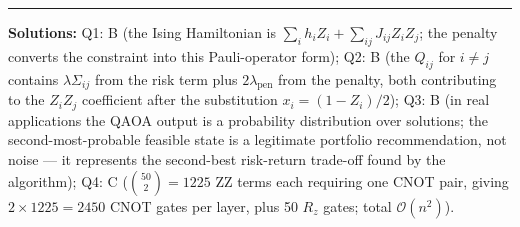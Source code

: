 \documentclass[a4paper,11pt]{article}
\begin{document}
\vspace{1cm}
\hrule
\vspace{0.2cm}
\footnotesize{\textbf{Solutions:}
Q1: B (the Ising Hamiltonian is $\sum_i h_i Z_i + \sum_{ij} J_{ij} Z_iZ_j$;
    the penalty converts the constraint into this Pauli-operator form);
Q2: B (the $Q_{ij}$ for $i\neq j$ contains $\lambda\Sigma_{ij}$ from
    the risk term plus $2\lambda_\text{pen}$ from the penalty, both
    contributing to the $Z_iZ_j$ coefficient after the substitution
    $x_i=(1-Z_i)/2$);
Q3: B (in real applications the QAOA output is a probability distribution
    over solutions; the second-most-probable feasible state is a legitimate
    portfolio recommendation, not noise — it represents the second-best
    risk-return trade-off found by the algorithm);
Q4: C ($\binom{50}{2} = 1225$ ZZ terms each requiring one CNOT pair,
    giving $2\times 1225 = 2450$ CNOT gates per layer, plus 50 $R_z$
    gates; total $\mathcal{O}(n^2)$).}
\end{document}
